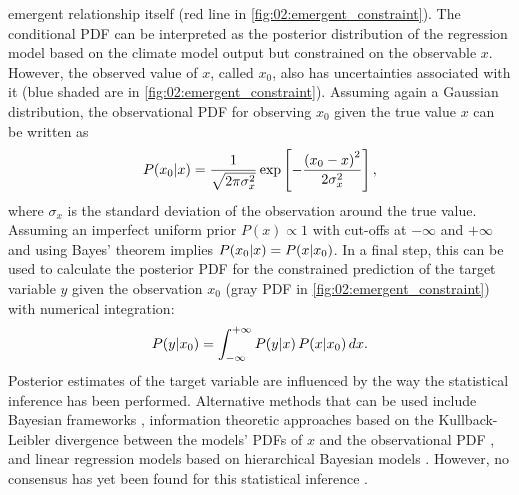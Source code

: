 emergent relationship itself (red line in \cref{fig:02:emergent_constraint}).
The conditional \ac{PDF} can be interpreted as the posterior distribution of
the regression model based on the climate model output but constrained on the
observable $x$. However, the observed value of $x$, called $x_0$, also has
uncertainties associated with it (blue shaded are in
\cref{fig:02:emergent_constraint}). Assuming again a Gaussian distribution, the
observational \ac{PDF} for observing $x_0$ given the true value $x$ can be
written as
\begin{equation}
  P(x_0|x) = \frac{1}{\sqrt{2 \pi \sigma_x^2}} \exp \left[ -\frac{\left(
    x_0 - x \right)^2}{2 \sigma_x^2} \right],
  \label{eq:02:pdf_obs}
\end{equation}
where $\sigma_x$ is the standard deviation of the observation around the true
value. Assuming an imperfect uniform prior $P(x) \propto 1$ with cut-offs at
$-\infty$ and $+\infty$ and using Bayes' theorem implies $P(x_0|x) =
P(x|x_0)$. In a final step, this can be used to calculate the posterior
\ac{PDF} for the constrained prediction of the target variable $y$ given the
observation $x_0$ (gray \ac{PDF} in \cref{fig:02:emergent_constraint}) with
numerical integration:
\begin{equation}
  P(y|x_0) = \int_{-\infty}^{+\infty} P(y|x) \, P(x|x_0) \, d{}x.
  \label{eq:02:pdf_y_given_x0}
\end{equation}
Posterior estimates of the target variable are influenced by the way the
statistical inference has been performed. Alternative methods that can be used
include Bayesian frameworks \autocite{Renoult2020}, information theoretic
approaches based on the Kullback-Leibler divergence between the models'
\acp{PDF} of $x$ and the observational \ac{PDF} \autocite{Brient2016}, and
linear regression models based on hierarchical Bayesian models
\autocite{Nijsse2020}. However, no consensus has yet been found for this
statistical inference \autocite{Brient2020}.

